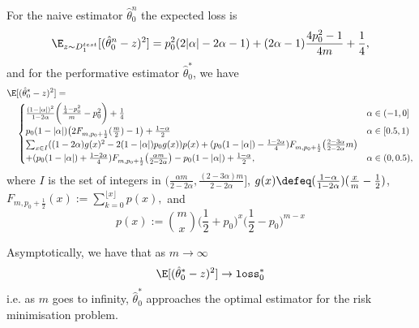 \begin{theorem}
    \label{theorem: expected_loss_full}
    For the naive estimator $\hat{\theta}_0^n$ the expected loss is 
    \begin{equation*}
        \E_{z \sim D_1^{test}}[(\hat{\theta}_0^n - z)^2] = p_0^2 (2 |\alpha| -
        2\alpha - 1) + (2\alpha - 1)\frac{4p_0^2 - 1}{4m} + \frac14,
    \end{equation*}
    and for the performative estimator $\hat{\theta}_0^\ast$, we have 
    \begin{align*}
        \E&[(\hat{\theta}_0^\ast - z)^2] =\\
        &\begin{cases}
            \frac{(1 - |\alpha|)^2}{1-2\alpha} \bigg( \frac{\frac14 - p_0^2}{m}
            - p_0^2 \bigg) + \frac14 & \alpha \in (-1, 0]\\
            p_0 (1 - |\alpha|) \big(2F_{m, p_0 + \frac12}(\frac{m}{2}) - 1\big)
            + \frac{1-\alpha}{2} & \alpha \in [0.5, 1)\\
            \sum_{x \in I}((1 - 2\alpha)g(x)^2 - 2(1 - |\alpha|)p_0 g(x)) p(x) +
            (p_0(1-|\alpha|) - \frac{1-2\alpha}{4})F_{m, p_0 +
            \frac{1}{2}}\bigl(\frac{2 - 3\alpha}{2 - 2\alpha}m \bigr) & \\
            + (p_0(1-|\alpha|) + \frac{1-2\alpha}{4})F_{m, p_0 +
            \frac{1}{2}}\bigl( \frac{\alpha m}{2 - 2\alpha} \bigr) - p_0
            (1-|\alpha|) + \frac{1-\alpha}{2}, & \alpha \in (0, 0.5),
        \end{cases}
    \end{align*}
    where $I$ is the set of integers in $\big(\frac{\alpha m}{2-2\alpha},
    \frac{(2-3\alpha)m}{2-2\alpha} \big]$, $g(x) \defeq (\frac{1-\alpha}{1-2\alpha})(\frac{x}{m} -
    \frac{1}{2})$, $F_{m, p_0 + \frac12} (x) :=
    \sum_{k=0}^{\lfloor x \rfloor} p(x),$ and
    \begin{equation*}
        p(x) := \binom{m}{x} \bigg(\frac12 + p_0\bigg)^x \bigg(\frac12 -
        p_0\bigg)^{m-x}
    \end{equation*}

    Asymptotically, we have that as $m \to \infty$
    \begin{equation*}
        \E[(\hat{\theta}_0^\ast - z)^2] \to \verb|loss|_0^\ast
    \end{equation*}
    i.e. as $m$ goes to infinity, $\hat{\theta}_0^\ast$ approaches the optimal
    estimator for the risk minimisation problem.
\end{theorem}

\clearpage
